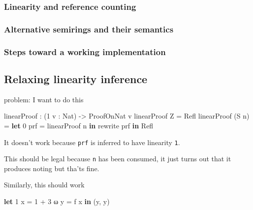 \documentclass[
]{article}
\newenvironment{Shaded}{}{}
\newcommand{\DataTypeTok}[1]{\textcolor[rgb]{0.56,0.13,0.00}{#1}}
\newcommand{\DecValTok}[1]{\textcolor[rgb]{0.25,0.63,0.44}{#1}}
\newcommand{\KeywordTok}[1]{\textcolor[rgb]{0.00,0.44,0.13}{\textbf{#1}}}
\newcommand{\NormalTok}[1]{#1}
\newcommand{\OperatorTok}[1]{\textcolor[rgb]{0.40,0.40,0.40}{#1}}
\newcommand{\OtherTok}[1]{\textcolor[rgb]{0.00,0.44,0.13}{#1}}
\begin{document}
\hypertarget{linearity-and-reference-counting}{%
\subsubsection{Linearity and reference
counting}\label{linearity-and-reference-counting}}

\hypertarget{alternative-semirings-and-their-semantics}{%
\subsubsection{Alternative semirings and their
semantics}\label{alternative-semirings-and-their-semantics}}

\hypertarget{steps-toward-a-working-implementation}{%
\subsubsection{Steps toward a working
implementation}\label{steps-toward-a-working-implementation}}

\hypertarget{relaxing-linearity-inference}{%
\subsection{Relaxing linearity
inference}\label{relaxing-linearity-inference}}

problem: I want to do this

\begin{Shaded}
\begin{Highlighting}[]
\NormalTok{linearProof }\OperatorTok{:}\NormalTok{ (}\DecValTok{1}\NormalTok{ v }\OperatorTok{:} \DataTypeTok{Nat}\NormalTok{) }\OtherTok{{-}\textgreater{}} \DataTypeTok{ProofOnNat}\NormalTok{ v}
\NormalTok{linearProof }\DataTypeTok{Z} \OtherTok{=} \DataTypeTok{Refl} 
\NormalTok{linearProof (}\DataTypeTok{S}\NormalTok{ n) }\OtherTok{=} \KeywordTok{let} \DecValTok{0}\NormalTok{ prf }\OtherTok{=}\NormalTok{ linearProof n }\KeywordTok{in} 
\NormalTok{                        rewrite prf }\KeywordTok{in} \DataTypeTok{Refl}
\end{Highlighting}
\end{Shaded}

It doesn't work because \texttt{prf} is inferred to have linearity
\texttt{1}.

This should be legal because \texttt{n} has been consumed, it just turns
out that it produces noting but tha'ts fine.

Similarly, this should work

\begin{Shaded}
\begin{Highlighting}[]
\KeywordTok{let} \DecValTok{1}\NormalTok{ x }\OtherTok{=} \DecValTok{1} \OperatorTok{+} \DecValTok{3}
\NormalTok{    ω y }\OtherTok{=}\NormalTok{ f x }\KeywordTok{in}
\NormalTok{    (y, y)}
\end{Highlighting}
\end{Shaded}
\end{document}
